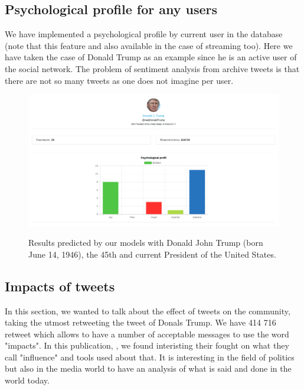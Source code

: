 \documentclass{acmtog} %
\begin{document}
\subsection{Psychological profile for any users}
\label{subsub:psychological_profile}

We have implemented a psychological profile by current user in the database (note that this feature and also available in the case of streaming too). Here we have taken the case of Donald Trump as an example since he is an active user of the social network.
The problem of sentiment analysis from archive tweets is that there are not so many tweets as one does not imagine per user.

\begin{figure}[h!]
{\includegraphics[width=\linewidth]{Trump-results-analysis_exemple.png}}
\caption{Results predicted by our models with Donald John Trump (born June 14, 1946), the 45th and current President of the United States.}
  \label{fig:trump_results}
\end{figure}


\subsection{Impacts of tweets}
\label{subsub:impacts_tweets}

In this section, we wanted to talk about the effect of tweets on the community, taking the utmost retweeting the tweet of Donals Trump. We have 414 716 retweet which allows to have a number of acceptable messages to use the word "impacts". In this publication, \cite{Vyas17}, we found interisting their fought on what they call "influence" and tools used about that. It is interesting in the field of politics but also in the media world to have an analysis of what is said and done in the world today.
\end{document}
